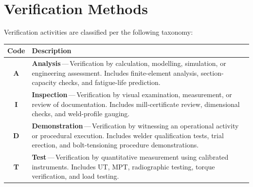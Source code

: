 \section{Verification Methods}

Verification activities are classified per the following taxonomy:

\vspace{6pt}
\noindent
\begin{tabularx}{\linewidth}{@{}>{\bfseries\color{accent}}c@{\hspace{6mm}}>{\raggedright\arraybackslash}X@{}}
\toprule
\rowcolor{accent}\color{white}\bfseries Code & \color{white}\bfseries Description \\
\midrule
A & \textbf{Analysis}\,---\,Verification by calculation, modelling, simulation, or engineering assessment. Includes finite-element analysis, section-capacity checks, and fatigue-life prediction. \\[3pt]
I & \textbf{Inspection}\,---\,Verification by visual examination, measurement, or review of documentation. Includes mill-certificate review, dimensional checks, and weld-profile gauging. \\[3pt]
D & \textbf{Demonstration}\,---\,Verification by witnessing an operational activity or procedural execution. Includes welder qualification tests, trial erection, and bolt-tensioning procedure demonstrations. \\[3pt]
T & \textbf{Test}\,---\,Verification by quantitative measurement using calibrated instruments. Includes UT, MPT, radiographic testing, torque verification, and load testing. \\
\bottomrule
\end{tabularx}

